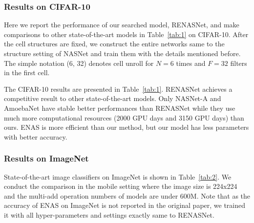 \documentclass[10pt,twocolumn,letterpaper]{article}
\begin{document}
\subsubsection{Results on CIFAR-10}

Here we report the performance of our searched model, RENASNet, and make comparisons to other state-of-the-art models in Table~\ref{tab:1} on CIFAR-10. 
After the cell structures are fixed, we construct the entire networks same to the structure setting of NASNet\cite{zoph2017learning} and train them with the details mentioned before. The simple notation (6, 32) denotes cell unroll for $N=6$ times and $F=32$ filters in the first cell. %
 
\noindent
 The CIFAR-10 results are presented in Table~\ref{tab:1}. RENASNet achieves a competitive result to other state-of-the-art models. Only NASNet-A and AmoebaNet have stable better performances than RENASNet while they use much more computational resources (2000 GPU days and 3150 GPU days) than ours. ENAS is more efficient than our method, but our model has less parameters with better accuracy. 

\subsubsection{Results on ImageNet}
State-of-the-art image classifiers on ImageNet is shown in Table~\ref{tab:2}.
We conduct the comparison in the mobile setting where the image size is 224x224 and the multi-add operation numbers of models are under 600M. Note that as the accuracy of ENAS\cite{pham2018efficient} on ImageNet is not reported in the original paper, we trained it with all hyper-parameters and settings exactly same to RENASNet.
\end{document}
